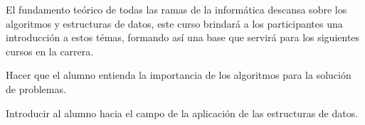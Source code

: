 \begin{syllabus}


\begin{justification}
El fundamento teórico de todas las ramas de la informática descansa sobre los algoritmos y estructuras de datos, este curso brindará a los participantes una introducción a estos témas, formando así una base que servirá para los siguientes cursos en la carrera.
\end{justification}

\begin{goals}
\item Hacer que el alumno entienda la importancia de los algoritmos para la solución de problemas.
\item Introducir al alumno hacia el campo de la aplicación de las estructuras de datos.
\end{goals}

\begin{outcomes}
    \item {}
    \item {}
    \item {}
    \item {}
    \item {}
\end{outcomes}

\begin{competences}
    \item {} 
    \item {}
    \item {}
    \item {}
    \item {}
    \item {}
    
\end{competences}


\end{syllabus}
